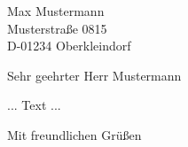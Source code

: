 \documentclass[de-RSE_Brief,a4paper]{scrlttr2}
\begin{document}

\begin{letter}{
    Max Mustermann\\
    Musterstraße 0815\\
    D-01234 Oberkleindorf
}
\opening{Sehr geehrter Herr Mustermann}
... Text ...

\closing{Mit freundlichen Grüßen}
\end{letter}
\end{document}
